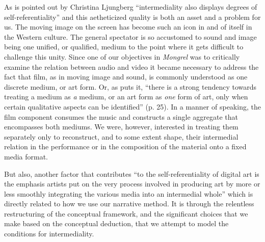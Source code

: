 \documentclass[11pt]{article}
\begin{document}
As is pointed out by Christina Ljungberg ``intermediality also
displays degrees of self-referentiality''
\citep[p. 88]{Ellestrom2010-CL} and this aetheticized quality is both
an asset and a problem for us. The moving image on the screen has
become such an icon in and of itself in the Western culture. The
general spectator is so accustomed to sound and image being one
unified, or qualified, medium to the point where it gets difficult to
challenge this unity. Since one of our objectives in \emph{Mongrel}
was to critically examine the relation between audio and video it
became necessary to address the fact that film, as in moving image and
sound, is commonly understood as one discrete medium, or art form. Or,
as \citeauthor{Ellestrom2010} puts it, ``there is a strong tendency
towards treating a medium as \emph{a} medium, or an art form as
\emph{one} form of art, only when certain qualitative aspects can be
identified'' (p. 25). In a manner of speaking, the film component
consumes the music and constructs a single aggregate that encompasses
both mediums. We were, however, interested in treating them separately
only to reconstruct, and to some extent shape, their intermedial
relation in the performance or in the composition of the material onto
a fixed media format.

But also, another factor that contributes ``to the
self-referentiality of digital art is the emphasis artists put on the
very process involved in producing art by more or less smoothly
integrating the various media into an intermedial whole''
\citep[p. 90]{Ellestrom2010-CL} which is directly related to how we
use our narrative method. It is through the relentless restructuring of the
conceptual framework, and the significant choices that we make based on
the conceptual deduction, that we attempt to model the conditions for
intermediality.


\end{document}
